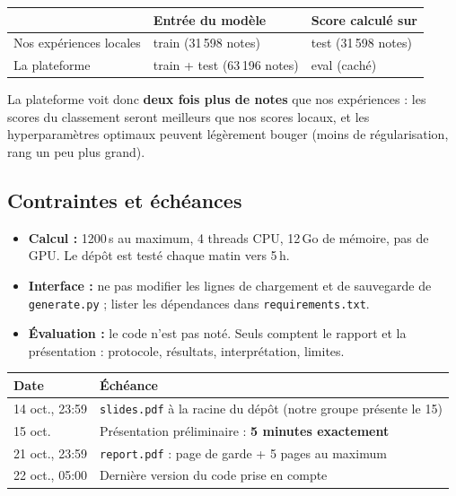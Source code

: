 \documentclass[11pt,a4paper]{article}
\begin{document}
\begin{table}[H]
\centering
\begin{tabular}{@{}lll@{}}
\toprule
 & \textbf{Entrée du modèle} & \textbf{Score calculé sur} \\
\midrule
Nos expériences locales & train (31\,598 notes) & test (31\,598 notes) \\
La plateforme           & train + test (63\,196 notes) & eval (caché) \\
\bottomrule
\end{tabular}
\end{table}

La plateforme voit donc \textbf{deux fois plus de notes} que nos expériences :
les scores du classement seront meilleurs que nos scores locaux, et les
hyperparamètres optimaux peuvent légèrement bouger (moins de régularisation,
rang un peu plus grand).

\subsection{Contraintes et échéances}

\begin{itemize}
  \item \textbf{Calcul :} 1200\,s au maximum, 4 threads CPU, 12\,Go de mémoire,
        pas de GPU. Le dépôt est testé chaque matin vers 5\,h.
  \item \textbf{Interface :} ne pas modifier les lignes de chargement et de
        sauvegarde de \texttt{generate.py} ; lister les dépendances dans
        \texttt{requirements.txt}.
  \item \textbf{Évaluation :} le code n'est pas noté. Seuls comptent le rapport et
        la présentation : protocole, résultats, interprétation, limites.
\end{itemize}

\begin{table}[H]
\centering
\begin{tabular}{@{}ll@{}}
\toprule
\textbf{Date} & \textbf{Échéance} \\
\midrule
14 oct., 23:59 & \texttt{slides.pdf} à la racine du dépôt (notre groupe présente le 15) \\
15 oct.        & Présentation préliminaire : \textbf{5 minutes exactement} \\
21 oct., 23:59 & \texttt{report.pdf} : page de garde + 5 pages au maximum \\
22 oct., 05:00 & Dernière version du code prise en compte \\
\bottomrule
\end{tabular}
\end{table}
\end{document}
